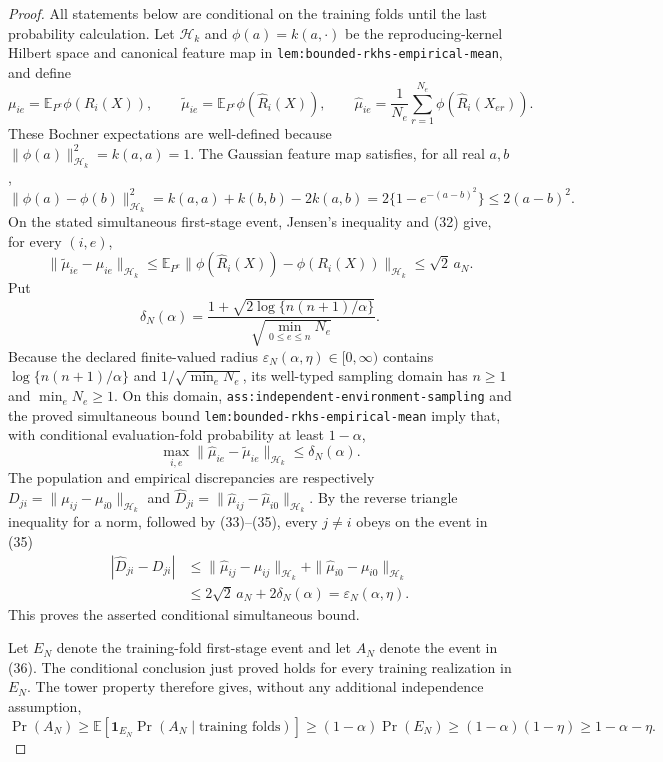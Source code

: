\documentclass{article}
\begin{document}
\begin{proof}
All statements below are conditional on the training folds until the last probability calculation.  Let \(\mathcal H_k\) and \(\phi(a)=k(a,\cdot)\) be the reproducing-kernel Hilbert space and canonical feature map in \texttt{lem:bounded-rkhs-empirical-mean}, and define
\[
 \mu_{ie}=\mathbb E_{P^e}\phi(R_i(X)),\qquad
 \widetilde\mu_{ie}=\mathbb E_{P^e}\phi(\widehat R_i(X)),\qquad
 \widehat\mu_{ie}=\frac1{N_e}\sum_{r=1}^{N_e}
 \phi(\widehat R_i(X_{er})).
\tag{31}
\]
These Bochner expectations are well-defined because \(\|\phi(a)\|_{\mathcal H_k}^2=k(a,a)=1\).  The Gaussian feature map satisfies, for all real \(a,b\),
\[
 \|\phi(a)-\phi(b)\|_{\mathcal H_k}^2
 =k(a,a)+k(b,b)-2k(a,b)
 =2\{1-e^{-(a-b)^2}\}
 \le2(a-b)^2.
\tag{32}
\]
On the stated simultaneous first-stage event, Jensen's inequality and (32) give, for every \((i,e)\),
\[
 \|\widetilde\mu_{ie}-\mu_{ie}\|_{\mathcal H_k}
 \le\mathbb E_{P^e}\|\phi(\widehat R_i(X))-\phi(R_i(X))\|_{\mathcal H_k}
 \le\sqrt2\,a_N.
\tag{33}
\]
Put
\[
 \delta_N(\alpha)=
 \frac{1+\sqrt{2\log\{n(n+1)/\alpha\}}}
 {\sqrt{\min_{0\le e\le n}N_e}}.
\tag{34}
\]
Because the declared finite-valued radius \(\varepsilon_N(\alpha,\eta)\in[0,\infty)\) contains \(\log\{n(n+1)/\alpha\}\) and \(1/\sqrt{\min_eN_e}\), its well-typed sampling domain has \(n\ge1\) and \(\min_eN_e\ge1\).  On this domain, \texttt{ass:independent-environment-sampling} and the proved simultaneous bound \texttt{lem:bounded-rkhs-empirical-mean} imply that, with conditional evaluation-fold probability at least \(1-\alpha\),
\[
 \max_{i,e}\|\widehat\mu_{ie}-\widetilde\mu_{ie}\|_{\mathcal H_k}
 \le\delta_N(\alpha).
\tag{35}
\]
The population and empirical discrepancies are respectively
\(D_{ji}=\|\mu_{ij}-\mu_{i0}\|_{\mathcal H_k}\) and
\(\widehat D_{ji}=\|\widehat\mu_{ij}-\widehat\mu_{i0}\|_{\mathcal H_k}\).  By the reverse triangle inequality for a norm, followed by (33)--(35), every \(j\ne i\) obeys on the event in (35)
\[
 \begin{aligned}
 |\widehat D_{ji}-D_{ji}|
 &\le
 \|\widehat\mu_{ij}-\mu_{ij}\|_{\mathcal H_k}
 +\|\widehat\mu_{i0}-\mu_{i0}\|_{\mathcal H_k}\\
 &\le2\sqrt2\,a_N+2\delta_N(\alpha)
 =\varepsilon_N(\alpha,\eta).
 \end{aligned}
\tag{36}
\]
This proves the asserted conditional simultaneous bound.

Let \(E_N\) denote the training-fold first-stage event and let \(A_N\) denote the event in (36).  The conditional conclusion just proved holds for every training realization in \(E_N\).  The tower property therefore gives, without any additional independence assumption,
\[
 \Pr(A_N)
 \ge \mathbb E\!\left[\mathbf 1_{E_N}\Pr(A_N\mid\text{training folds})\right]
 \ge(1-\alpha)\Pr(E_N)
 \ge(1-\alpha)(1-\eta)
 \ge1-\alpha-\eta.
\tag{37}
\]


\end{proof}
\end{document}
